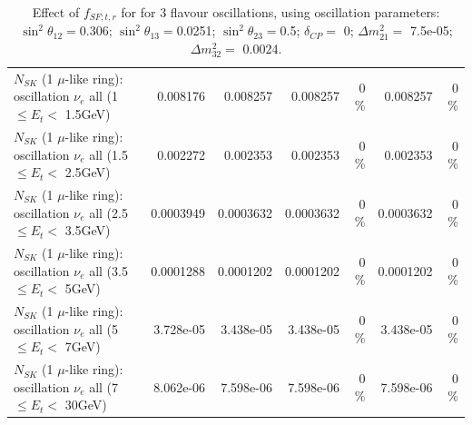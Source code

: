 \begin{table}
\begin{tabular}{| l | r | r | r  r | r  r |}
$N_{SK}$ (1 $\mu$-like ring): oscillation $\nu_{e}$ all (1 $\leq E_{t} <$ 1.5GeV) &        0.008176 &        0.008257 &        0.008257 &        0 \%  &        0.008257 &        0 \%  \\ 
$N_{SK}$ (1 $\mu$-like ring): oscillation $\nu_{e}$ all (1.5 $\leq E_{t} <$ 2.5GeV) &        0.002272 &        0.002353 &        0.002353 &        0 \%  &        0.002353 &        0 \%  \\ 
$N_{SK}$ (1 $\mu$-like ring): oscillation $\nu_{e}$ all (2.5 $\leq E_{t} <$ 3.5GeV) &       0.0003949 &       0.0003632 &       0.0003632 &        0 \%  &       0.0003632 &        0 \%  \\ 
$N_{SK}$ (1 $\mu$-like ring): oscillation $\nu_{e}$ all (3.5 $\leq E_{t} <$ 5GeV) &       0.0001288 &       0.0001202 &       0.0001202 &        0 \%  &       0.0001202 &        0 \%  \\ 
 $N_{SK}$ (1 $\mu$-like ring): oscillation $\nu_{e}$ all (5 $\leq E_{t} <$ 7GeV) &       3.728e-05 &       3.438e-05 &       3.438e-05 &        0 \%  &       3.438e-05 &        0 \%  \\ 
$N_{SK}$ (1 $\mu$-like ring): oscillation $\nu_{e}$ all (7 $\leq E_{t} <$ 30GeV) &       8.062e-06 &       7.598e-06 &       7.598e-06 &        0 \%  &       7.598e-06 &        0 \%  \\ 
\hline
\hline
\end{tabular}
\caption{ Effect of $f_{SF; t, r}$ for for 3 flavour oscillations, using oscillation parameters:  $\sin^2\theta_{12} = $0.306; $\sin^2\theta_{13} = $0.0251; $\sin^2\theta_{23} = $0.5; $\delta_{CP} = $        0; $\Delta m^2_{21} = $    7.5e-05; $\Delta m^2_{32} = $    0.0024. }
\label{tab:num_xsec_sf_1RmuT_3f_osc_t13:0.0251}
\end{table}
\clearpage
